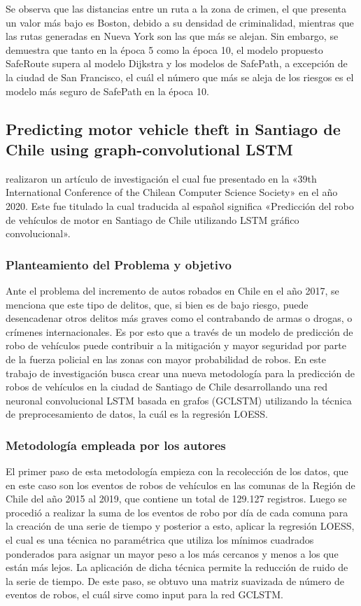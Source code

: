 Se observa que las distancias entre un ruta a la zona de crimen, el que presenta un valor más bajo es Boston, debido a su densidad de criminalidad, mientras que las rutas generadas en Nueva York son las que más se alejan. Sin embargo, se demuestra que tanto en la época 5 como la época 10, el modelo propuesto SafeRoute supera al modelo Dijkstra y los modelos de SafePath, a excepción de la ciudad de San Francisco, el cuál el número que más se aleja de los riesgos es el modelo más seguro de SafePath en la época 10.

\subsection{Predicting motor vehicle theft in Santiago de Chile using graph-convolutional LSTM \citep*{pr_dehghani2018copper}}
\citeauthor{pr_dehghani2018copper} realizaron un artículo de investigación el cual fue presentado en la «39th International Conference of the Chilean Computer Science Society» en el año 2020. Este fue titulado  la cual traducida al español significa «Predicción del robo de vehículos de motor en Santiago de Chile utilizando LSTM gráfico convolucional».

\subsubsection{Planteamiento del Problema y objetivo }
Ante el problema del incremento de autos robados en Chile en el año 2017, se menciona que este tipo de delitos, que, si bien es de bajo riesgo, puede desencadenar otros delitos más graves como el contrabando de armas o drogas, o crímenes internacionales. Es por esto que a través de un modelo de predicción de robo de vehículos puede contribuir a la mitigación y mayor seguridad por parte de la fuerza policial en las zonas con mayor probabilidad de robos. En este trabajo de investigación busca crear una nueva metodología para la predicción de robos de vehículos en la ciudad de Santiago de Chile desarrollando una red neuronal convolucional LSTM basada en grafos (GCLSTM) utilizando la técnica de preprocesamiento de datos, la cuál es la regresión LOESS.


\subsubsection{Metodología empleada por los autores}
El primer paso de esta metodología empieza con la recolección de los datos, que en este caso son los eventos de robos de vehículos en las comunas de la Región de Chile del año 2015 al 2019, que contiene un total de 129.127 registros. Luego se procedió a realizar la suma de los eventos de robo por día de cada comuna para la creación de una serie de tiempo y posterior a esto, aplicar la regresión LOESS, el cual es una técnica no paramétrica que utiliza los mínimos cuadrados ponderados para asignar un mayor peso a los más cercanos y menos a los que están más lejos. La aplicación de dicha técnica permite la reducción de ruido de la serie de tiempo. De este paso, se obtuvo una matriz suavizada de número de eventos de robos, el cuál sirve como input para la red GCLSTM. 

